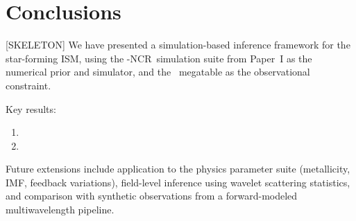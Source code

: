 \section{Conclusions}
\label{sec:conclusions}

[SKELETON] We have presented a simulation-based inference framework for the
star-forming ISM, using the \TIGRESS-NCR\ simulation suite from Paper~I as
the numerical prior and simulator, and the \PHANGS\ megatable as the observational
constraint.

Key results:
\begin{enumerate}
  \item [PLACEHOLDER]
  \item [PLACEHOLDER]
\end{enumerate}

Future extensions include application to the physics parameter suite (metallicity,
IMF, feedback variations), field-level inference using wavelet scattering statistics,
and comparison with synthetic observations from a forward-modeled multiwavelength
pipeline.
